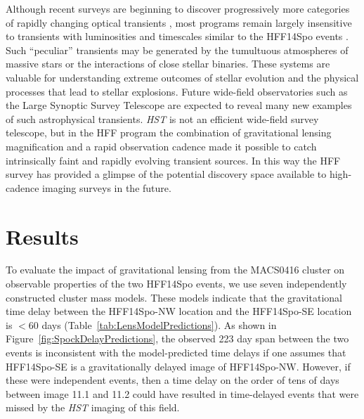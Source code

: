 \documentclass{article}
\def\HST{{\it HST}\xspace}
\def\spock{HFF14Spo\xspace}
\def\spockone{HFF14Spo-NW\xspace}
\def\spocktwo{HFF14Spo-SE\xspace}
\def\MACS0416{MACS0416\xspace}
\begin{document}
Although recent surveys are beginning to discover progressively more
categories of rapidly changing optical transients
\cite{Kasliwal:2011a,Drout:2014}, most programs remain largely
insensitive to transients with luminosities and timescales similar to
the \spock events \cite{Berger:2013b}.  Such ``peculiar'' transients
may be generated by the tumultuous atmospheres of massive stars or the
interactions of close stellar binaries.  These systems are valuable
for understanding extreme outcomes of stellar evolution and the
physical processes that lead to stellar explosions. Future wide-field
observatories such as the Large Synoptic Survey
Telescope\cite{Tyson:2002} are expected to reveal many new examples of
such astrophysical transients.  \HST is not an efficient wide-field
survey telescope, but in the HFF program the combination of
gravitational lensing magnification and a rapid observation cadence
made it possible to catch intrinsically faint and rapidly evolving
transient sources.  In this way the HFF survey has provided a glimpse
of the potential discovery space available to high-cadence imaging
surveys in the future.



\section{Results}\label{sec:Results}

To evaluate the impact of gravitational lensing from the \MACS0416
cluster on observable properties of the two \spock events, we use seven
independently constructed cluster mass models.  These models indicate
that the gravitational time delay between the \spockone location and
the \spocktwo location is $<$60 days
(Table~\ref{tab:LensModelPredictions}).  As shown in
Figure~\ref{fig:SpockDelayPredictions}, the observed 223 day span
between the two events is inconsistent with the model-predicted time
delays if one assumes that \spocktwo is a gravitationally delayed
image of \spockone.  However, if these were independent events, then a
time delay on the order of tens of days between image 11.1 and 11.2
could have resulted in time-delayed events that were missed by the
\HST imaging of this field.
\end{document}
